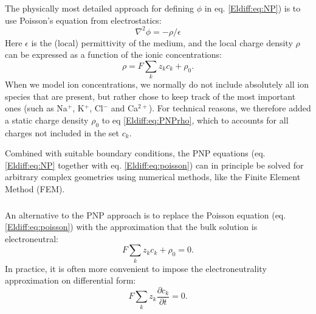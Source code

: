 \subsubsection{}
\label{sec:Eldiff:PNP}
The physically most detailed approach for defining $\phi$ in eq. \ref{Eldiff:eq:NP}) is to use Poisson's equation from electrostatics:
\begin{equation}
\nabla^2 \phi = -\rho/\epsilon
\label{Eldiff:eq:poisson}
\end{equation}
Here $\epsilon$ is the (local) permittivity of the medium, and the local charge density $\rho$ can be expressed as a function of the ionic concentrations:
\begin{equation}
\rho = F\sum_k z_k c_k + \rho_0.
\label{Eldiff:eq:PNPrho}
\end{equation}
When we model ion concentrations, we normally do not include absolutely all ion species that are present, but rather chose to keep track of the most important ones (such as Na$^+$, K$^+$, Cl$^-$ and Ca$^{2+}$). For technical reasons, we therefore added a static charge density $\rho_0$ to eq \ref{Eldiff:eq:PNPrho}, which to accounts for all charges not included in the set $c_k$. 

Combined with suitable boundary conditions, the PNP equations (eq. \ref{Eldiff:eq:NP} together with eq. \ref{Eldiff:eq:poisson}) can in principle be solved for arbitrary complex geometries using numerical methods, like the Finite Element Method (FEM). 


\subsubsection{}
\label{sec:Eldiff:electroneutral}
An alternative to the PNP approach is to replace the Poisson equation (eq. \ref{Eldiff:eq:poisson}) with the approximation that the bulk solution is electroneutral:
\begin{equation}
F \sum_k z_k c_k + \rho_0 = 0.
\label{Eldiff:eq:electroneutral}
\end{equation}
In practice, it is often more convenient to impose the electroneutrality approximation on differential form:
\begin{equation}
F \sum_k{z_k \frac{\partial c_k}{\partial t}} = 0.
\label{Eldiff:eq:electroneutral2}
\end{equation}

